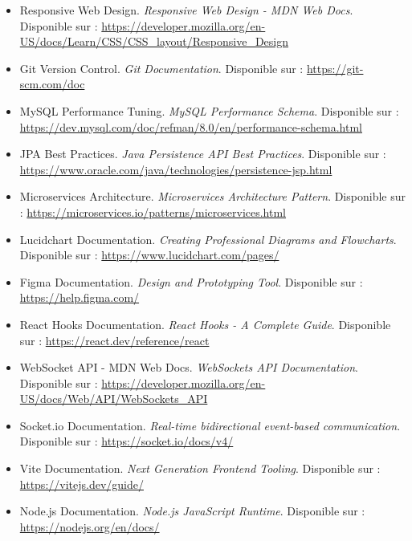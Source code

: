 \documentclass[12pt,a4paper]{report}
\begin{document}
\begin{itemize}
    \item Responsive Web Design. \textit{Responsive Web Design - MDN Web Docs}. Disponible sur : \url{https://developer.mozilla.org/en-US/docs/Learn/CSS/CSS_layout/Responsive_Design}
    
    \item Git Version Control. \textit{Git Documentation}. Disponible sur : \url{https://git-scm.com/doc}
    
    \item MySQL Performance Tuning. \textit{MySQL Performance Schema}. Disponible sur : \url{https://dev.mysql.com/doc/refman/8.0/en/performance-schema.html}
    
    \item JPA Best Practices. \textit{Java Persistence API Best Practices}. Disponible sur : \url{https://www.oracle.com/java/technologies/persistence-jsp.html}
    
    \item Microservices Architecture. \textit{Microservices Architecture Pattern}. Disponible sur : \url{https://microservices.io/patterns/microservices.html}
    
    \item Lucidchart Documentation. \textit{Creating Professional Diagrams and Flowcharts}. Disponible sur : \url{https://www.lucidchart.com/pages/}
    
    \item Figma Documentation. \textit{Design and Prototyping Tool}. Disponible sur : \url{https://help.figma.com/}
    
    \item React Hooks Documentation. \textit{React Hooks - A Complete Guide}. Disponible sur : \url{https://react.dev/reference/react}
    
    \item WebSocket API - MDN Web Docs. \textit{WebSockets API Documentation}. Disponible sur : \url{https://developer.mozilla.org/en-US/docs/Web/API/WebSockets_API}
    
    \item Socket.io Documentation. \textit{Real-time bidirectional event-based communication}. Disponible sur : \url{https://socket.io/docs/v4/}
    
    \item Vite Documentation. \textit{Next Generation Frontend Tooling}. Disponible sur : \url{https://vitejs.dev/guide/}
    
    \item Node.js Documentation. \textit{Node.js JavaScript Runtime}. Disponible sur : \url{https://nodejs.org/en/docs/}
    

\end{itemize}
\end{document}
